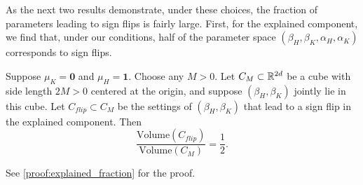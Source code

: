 As the next two results demonstrate, under these choices, the fraction of parameters leading to sign flips is fairly large.
%
First, for the explained component, we find that, under our conditions, half of the parameter space $(\beta_H, \beta_K, \alpha_H, \alpha_K)$ corresponds to sign flips.
\begin{proposition} \label{prop:explained_fraction}
	Suppose $\mu_K = \mathbf{0}$ and $\mu_H = \mathbf{1}$.
	Choose any $M > 0$.
	Let $C_M \subset \mathbb{R}^{2d}$ be a cube with side length $2M > 0$ centered at the origin, and suppose $(\beta_H, \beta_K)$ jointly lie in this cube. Let $C_{flip} \subset C_M$ be the settings of $(\beta_H, \beta_K)$ that lead to a sign flip in the explained component.
	Then
	\begin{equation}
		\frac{\mathrm{Volume}(C_{flip})}{\mathrm{Volume}(C_M)} = \frac{1}{2}.
	\end{equation}
\end{proposition}
See \cref{proof:explained_fraction} for the proof.

